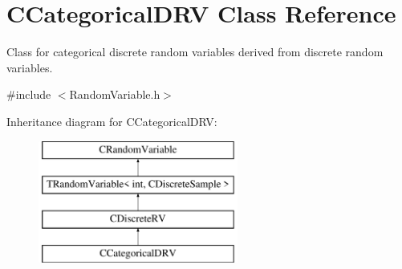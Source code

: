 \hypertarget{class_c_categorical_d_r_v}{\section{C\-Categorical\-D\-R\-V Class Reference}
\label{class_c_categorical_d_r_v}
}


Class for categorical discrete random variables derived from discrete random variables.  




{\ttfamily \#include $<$Random\-Variable.\-h$>$}

Inheritance diagram for C\-Categorical\-D\-R\-V\-:\begin{figure}[H]
\begin{center}
\leavevmode
\includegraphics[height=4.000000cm]{class_c_categorical_d_r_v}
\end{center}
\end{figure}
